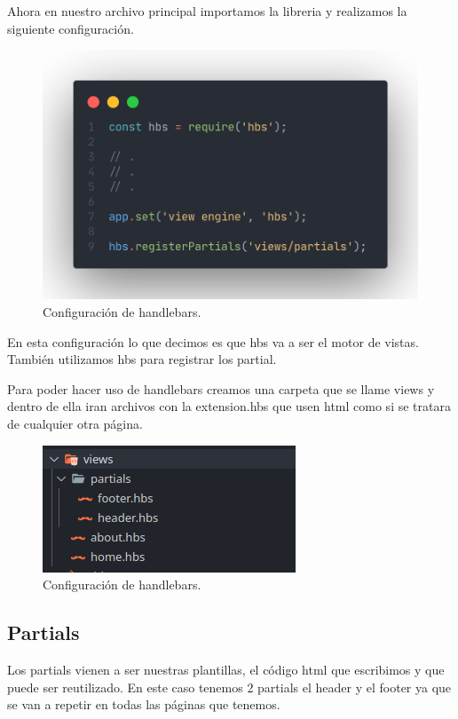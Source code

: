 \documentclass[12pt]{article}
\begin{document}
Ahora en nuestro archivo principal importamos la libreria y realizamos la siguiente configuración.

\begin{figure}[H]
  \centering
  \includegraphics[scale=.4]{assets/images/handlebars-code.png}
  \caption{Configuración de handlebars.}
\end{figure}

En esta configuración lo que decimos es que hbs va a ser el motor de vistas. También utilizamos hbs para registrar los partial.

Para poder hacer uso de handlebars creamos una carpeta que se llame views y dentro de ella iran archivos con la extension.hbs que usen html como si se tratara de cualquier otra página.

\begin{figure}[H]
  \centering
  \includegraphics[]{assets/images/partials.png}
  \caption{Configuración de handlebars.}
\end{figure}

\subsection{Partials}

Los partials vienen a ser nuestras plantillas, el código html que escribimos y que puede ser reutilizado. En este caso tenemos 2 partials el header y el footer ya que se van a repetir en todas las páginas que tenemos.
\end{document}
